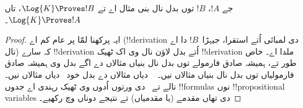 \documentclass[../../../include/open-logic-section]{subfiles}
\begin{document}
\begin{prop}
  جے $!A$، $!B$ توں بدل نال بنی مثال اے تے $\Log{K} \Proves !B$،
  تاں $\Log{K} \Proves !A$۔
\end{prop}

\begin{proof}
  ایہ پرکھنا لمّا پر عام کم اے (!!{derivation} دی لمبائی اُتے استقرا، جیہڑا~$!B$ دا اے نال) کہ سارے !!{derivation} اُتے بدل لاؤن نال وی اک ٹھیک
  !!{derivation} ملدا اے۔ خاص طور تے، ہمیشہ صادق فارمولے توں بدل نال بنیاں مثالاں دے اگے بدل وی ہمیشہ صادق فارمولیاں توں بدل نال بنیاں مثالاں نیں۔ ~ دیاں مثالاں دے بدل خود~ دیاں مثالاں نیں۔ نالے \MP{} تے~\Nec{} دی ورتوں اُدوں وی ٹھیک رہندی اے جدوں !!{formula}s نوں !!{propositional variable}s دی تھاں مقدمے (یا مقدمیاں) تے نتیجے دوناں وچ رکھیے۔
\end{proof}
\end{document}
